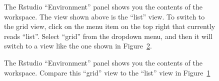 

\begin{figure}[t]
\begin{center}
\caption{The Rstudio ``Environment'' panel shows you the contents of the workspace. The view shown above is the ``list'' view. To switch to the grid view, click on the menu item on the top right that currently reads ``list''. Select ``grid'' from the dropdown menu, and then it will switch to a view like the one shown in Figure~\protect\ref{fig:workspace2}.}
\HR
\label{fig:workspace}
\end{center}
\end{figure}

\begin{figure}[t]
\begin{center}
\caption{The Rstudio ``Environment'' panel shows you the contents of the workspace. Compare this ``grid'' view to the ``list'' view in Figure~\protect\ref{fig:workspace}}
\HR
\label{fig:workspace2}
\end{center}
\end{figure}


